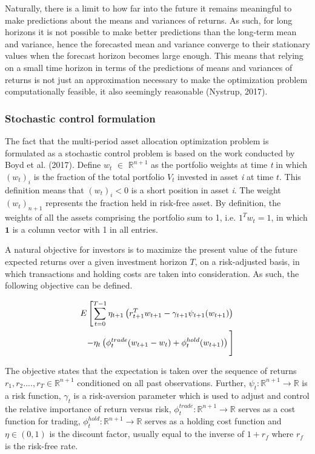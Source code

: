Naturally, there is a limit to how far into the future it remains meaningful to make predictions about the means and variances of returns. As such, for long horizons it is not possible to make better predictions than the long-term mean and variance, hence the forecasted mean and variance converge to their stationary values when the forecast horizon becomes large enough. This means that relying on a small time horizon in terms of the predictions of means and variances of returns is not just an approximation necessary to make the optimization problem computationally feasible, it also seemingly reasonable (Nystrup, 2017).

\subsubsection{Stochastic control formulation}
The fact that the multi-period asset allocation optimization problem is formulated as a stochastic control problem is based on the work conducted by Boyd et al. (2017). Define $w_t$ $\in$ $\mathbb{R}^{n+1}$ as the portfolio weights at time \textit{t} in which $(w_t)_{i}$ is the fraction of the total portfolio $V_t$ invested in asset \textit{i} at time $t$. This definition means that $(w_t)_{i} < 0$ is a short position in asset \textit{i}. The weight $(w_t)_{{n+1}}$ represents the fraction held in risk-free asset. By definition, the weights of all the assets comprising the portfolio sum to 1, i.e. ${1}^Tw_t = 1$, in which $\mathbf{1}$ is a column vector with 1 in all entries. 

A natural objective for investors is to maximize the present value of the future expected returns over a given investment horizon $T$, on a risk-adjusted basis, in which transactions and holding costs are taken into consideration. As such, the following objective can be defined.

\begin{equation}
\begin{split}
    E\left[\sum_{t=0}^{T-1}\eta_{t+1}\left(r_{t+1}^Tw_{t+1} -\gamma_{t+1}\psi_{t+1}(w_{t+1})\right) \right. \\
    \left. -\eta_t\left(\phi_t^{trade}(w_{t+1}-w_t)+\phi_t^{hold}(w_{t+1})\right)
    \vphantom{\sum_{t=0}^{T-1}} \right]
    \label{eq: MPC_stochastic}
\end{split}
\end{equation}

The objective states that the expectation is taken over the sequence of returns $r_1, r_2...., r_T \in \mathbb{R}^{n+1}$ conditioned on all past observations. Further, $\psi_t:\mathbb{R}^{n+1} \rightarrow \mathbb{R}$ is a risk function, $\gamma_t$ is a risk-aversion parameter which is used to adjust and control the relative importance of return versus risk, $\phi_t^{trade}: \mathbb{R}^{n+1}\rightarrow\mathbb{R}$ serves as a cost function for trading, $\phi_t^{hold}: \mathbb{R}^{n+1}\rightarrow\mathbb{R}$ serves as a holding cost function and $\eta \in (0,1)$ is the discount factor, usually equal to the inverse of $1+r_f$ where $r_f$ is the risk-free rate.


